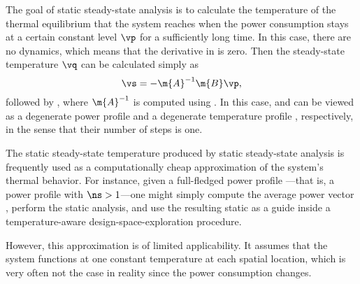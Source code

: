 The goal of static steady-state analysis is to calculate the temperature of the
thermal equilibrium that the system reaches when the power consumption stays at
a certain constant level $\vp$ for a sufficiently long time. In this case, there
are no dynamics, which means that the derivative in
 is zero. Then the steady-state temperature $\vq$
can be calculated simply as
\[
  \vs = -\m{A}^{-1} \m{B} \vp,
\]
followed by , where $\m{A}^{-1}$ is computed using
. In this case, \vp and \vq can be viewed as a degenerate
power profile \mp and a degenerate temperature profile \mq, respectively, in the
sense that their number of steps \ns is one.

The static steady-state temperature produced by static steady-state analysis is
frequently used as a computationally cheap approximation of the system's thermal
behavior. For instance, given a full-fledged power profile \mp---that is, a
power profile with $\ns > 1$---one might simply compute the average power vector
\vp, perform the static analysis, and use the resulting static \vq as a guide
inside a temperature-aware design-space-exploration procedure.

However, this approximation is of limited applicability. It assumes that the
system functions at one constant temperature at each spatial location, which is
very often not the case in reality since the power consumption changes.
